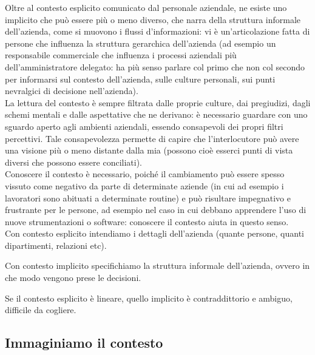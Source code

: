 Oltre al contesto esplicito comunicato dal  personale aziendale, ne esiste uno 
implicito che pu\`o essere pi\`u o meno diverso, che  narra della struttura 
informale dell'azienda, come si muovono i flussi d'informazioni: vi \`e 
un'articolazione fatta di persone che influenza la struttura gerarchica 
dell'azienda (ad esempio un responsabile  commerciale che influenza i processi 
aziendali pi\`u dell'amministratore  delegato: ha pi\`u senso parlare col primo 
che non col secondo per  informarsi sul contesto dell'azienda, sulle culture 
personali, sui punti nevralgici di decisione nell'azienda). \\
La  lettura del contesto \`e sempre filtrata dalle proprie culture, dai 
pregiudizi, dagli schemi mentali e dalle aspettative che ne derivano: \`e necessario  
guardare con uno sguardo aperto agli ambienti aziendali, essendo consapevoli 
dei propri filtri percettivi. Tale consapevolezza permette di capire che 
l'interlocutore  pu\`o avere una visione pi\`u o meno distante dalla mia 
(possono cio\`e  esserci punti di vista diversi che possono essere conciliati).\\
Conoscere il contesto \`e necessario, poich\'e il cambiamento pu\`o essere  
spesso vissuto come negativo da parte di determinate aziende (in cui  ad 
esempio i lavoratori sono abituati a determinate routine) e pu\`o  risultare 
impegnativo e frustrante per le persone, ad esempio nel caso in cui debbano 
apprendere l'uso di nuove strumentazioni o software: conoscere il  contesto 
aiuta in questo senso.\\

Con contesto esplicito intendiamo i dettagli dell'azienda (quante persone, 
quanti dipartimenti, relazioni etc).

Con contesto implicito specifichiamo la struttura informale dell'azienda, 
ovvero in che modo vengono prese le decisioni.

Se il contesto esplicito è lineare, quello implicito è contraddittorio e 
ambiguo, difficile da cogliere.

\subsection{Immaginiamo il contesto}

